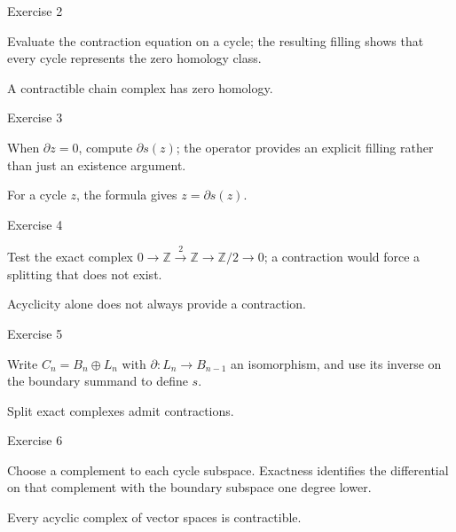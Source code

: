 \begin{exercise}\label{exr:viii23-02}
Exercise 2
\end{exercise}
\begin{hint}
Evaluate the contraction equation on a cycle; the resulting filling shows that every cycle represents the zero homology class.
\end{hint}
\begin{solution}
A contractible chain complex has zero homology.
\end{solution}

\begin{exercise}\label{exr:viii23-03}
Exercise 3
\end{exercise}
\begin{hint}
When \(\partial z=0\), compute \(\partial s(z)\); the operator provides an explicit filling rather than just an existence argument.
\end{hint}
\begin{solution}
For a cycle \(z\), the formula gives \(z=\partial s(z)\).
\end{solution}

\begin{exercise}\label{exr:viii23-04}
Exercise 4
\end{exercise}
\begin{hint}
Test the exact complex \(0\to\mathbb Z\xrightarrow{2}\mathbb Z\to\mathbb Z/2\to0\); a contraction would force a splitting that does not exist.
\end{hint}
\begin{solution}
Acyclicity alone does not always provide a contraction.
\end{solution}

\begin{exercise}\label{exr:viii23-05}
Exercise 5
\end{exercise}
\begin{hint}
Write \(C_n=B_n\oplus L_n\) with \(\partial:L_n\to B_{n-1}\) an isomorphism, and use its inverse on the boundary summand to define \(s\).
\end{hint}
\begin{solution}
Split exact complexes admit contractions.
\end{solution}

\begin{exercise}\label{exr:viii23-06}
Exercise 6
\end{exercise}
\begin{hint}
Choose a complement to each cycle subspace. Exactness identifies the differential on that complement with the boundary subspace one degree lower.
\end{hint}
\begin{solution}
Every acyclic complex of vector spaces is contractible.
\end{solution}

